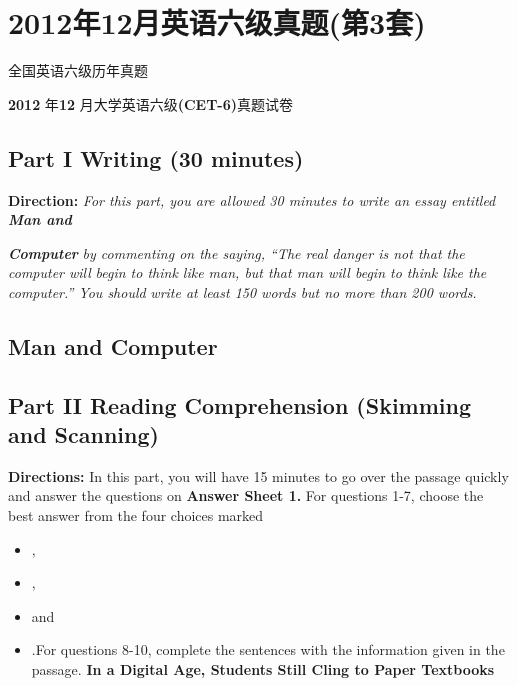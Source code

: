 \documentclass[UTF8,11pt]{ctexart}
\begin{document}
\section*{2012年12月英语六级真题(第3套)}
全国英语六级历年真题


\textbf{2012} 年\textbf{12} 月大学英语六级\textbf{(CET-6)}真题试卷


\subsection*{\textbf{Part I} \textbf{Writing} \textbf{(30 minutes)}}


\textbf{Direction:}\textit{ For this part, you are allowed 30 minutes to write an essay entitled}\textbf{\textit{ Man and}}


\textbf{\textit{Computer}}\textit{ by commenting on the saying, “The real danger is not that the computer will} \textit{begin to think like man, but that man will begin to think like the computer.” You should} \textit{write at least 150 words but no more than 200 words.}


\subsection*{\textbf{Man and Computer}}


\subsection*{\textbf{Part II} \textbf{Reading Comprehension (Skimming and Scanning)}}


\textbf{Directions:} In this part, you will have 15 minutes to go over the passage quickly and answer the questions on\textbf{ Answer Sheet 1.} For questions 1-7, choose the best answer from the four choices marked


\begin{itemize}[leftmargin=2em,itemsep=.2em,topsep=.4em]\item[A.] ,
\item[B.] ,
\item[C.] and
\item[D.] .For questions 8-10, complete the sentences with the information given in the passage. \textbf{In a Digital Age, Students Still Cling to Paper Textbooks}
\end{itemize}
\end{document}
